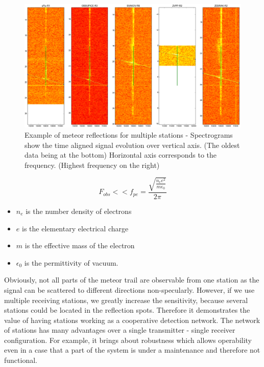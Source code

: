 \documentclass[twoside]{ctuthesis}
\theoremstyle{plain}
\theoremstyle{definition}
\theoremstyle{note}
\begin{document}
\begin{figure}
 \begin{center}
 \includegraphics[width=\textwidth]{./img/Raws_analyser.png}
 \caption{Example of meteor reflections for multiple stations - Spectrograms show the time aligned signal evolution over vertical axis. (The oldest data being at the bottom) Horizontal axis corresponds to the frequency. (Highest frequency on the right)}
  \label{fig:meteor_reflections} 
 \end{center}
\end{figure}

\begin{equation}
F_{obs} << f_{pe} =\frac{\sqrt{\frac{n_e e^2}{m \epsilon_0}}}{2 \pi}
\label{equ:plasma_frequency}
\end{equation}
\begin{itemize}
\item $n_e$ is the number density of electrons
\item $e$ is the elementary electrical charge
\item $m$ is the effective mass of the electron
\item $\epsilon_0$ is the permittivity of vacuum.
\end{itemize}

Obviously, not all parts of the meteor trail are observable from one station as the signal can be scattered to different directions non-specularly.
However, if we use multiple receiving stations, we greatly increase the sensitivity, because several stations could be located in the reflection spots. Therefore it demonstrates the value of having stations working as a cooperative detection network.
The network of stations has many advantages over a single transmitter - single receiver configuration. For example, it brings about robustness which allows operability even in a case that a part of the system is under a maintenance and therefore not functional.
                   
\end{document}
